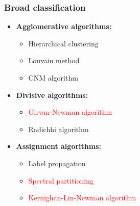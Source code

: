 \documentclass{beamer}
\begin{document}
\begin{frame}
    \frametitle{Broad classification}
    \centering
    \begin{itemize}
        \setlength\itemsep{0.5em}
        \item{{\bf Agglomerative algorithms:}
            
    \begin{itemize}
        \setlength\itemsep{0.5em}
        \item{Hierarchical clustering}
        \item{Louvain method}
        \item{CNM algorithm}
    \end{itemize}
            
            }
        \item{{\bf Divisive algorithms:}
            
    \begin{itemize}
        \setlength\itemsep{0.5em}
        \item{\textcolor{red}{Girvan-Newman algorithm}}
        \item{Radichhi algorithm}
    \end{itemize}
            
            
            }
        \item{{\bf Assignment algorithms:}

    \begin{itemize}
        \setlength\itemsep{1em}
        \item{Label propagation}
        \item{\textcolor{red}{Spectral partitioning}}
        \item{\textcolor{red}{Kernighan-Lin-Newman algorithm}}
    \end{itemize}

            }
    \end{itemize}
\end{frame}
\end{document}
